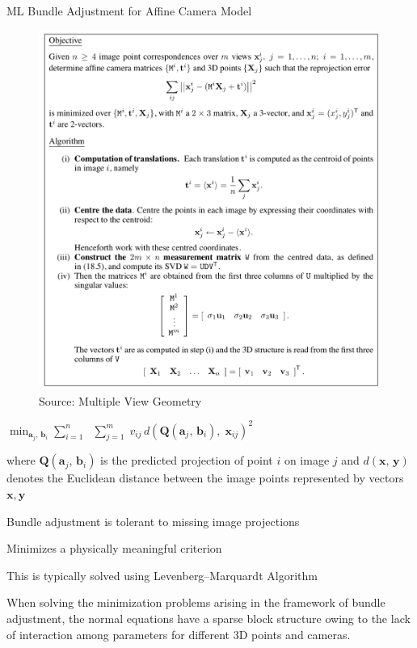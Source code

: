 \begin{enumerate}
ML Bundle Adjustment for Affine Camera Model

\begin{figure}[h]
\includegraphics[width=1.0\columnwidth]{cv_figures/ml_bundle.png}
\caption{Source: Multiple View Geometry}
\end{figure}

$\min _{{{\mathbf  {a}}_{j},\,{\mathbf  {b}}_{i}}} \sum _{{i=1}}^{{n}}\; $
$ \sum _{{j=1}}^{{m}}\;v_{{ij}}\,d({\mathbf  {Q}}({\mathbf  {a}}_{j},\,{\mathbf  {b}}_{i}),\;{\mathbf{x}}_{{ij}})^{2}$

where $\mathbf {Q} (\mathbf {a} _{j},\,\mathbf {b} _{i})$ is the predicted projection of point $i$ on image $j$ and $d(\mathbf {x} ,\,\mathbf {y} )$  denotes the Euclidean distance between the image points represented by vectors $\mathbf{x,y}$

Bundle adjustment is tolerant to missing image projections 

Minimizes a physically meaningful criterion

This is typically solved using Levenberg–Marquardt Algorithm

When solving the minimization problems arising in the framework of bundle adjustment, the normal equations have a sparse block structure owing to the lack of interaction among parameters for different 3D points and cameras.


\end{enumerate}
